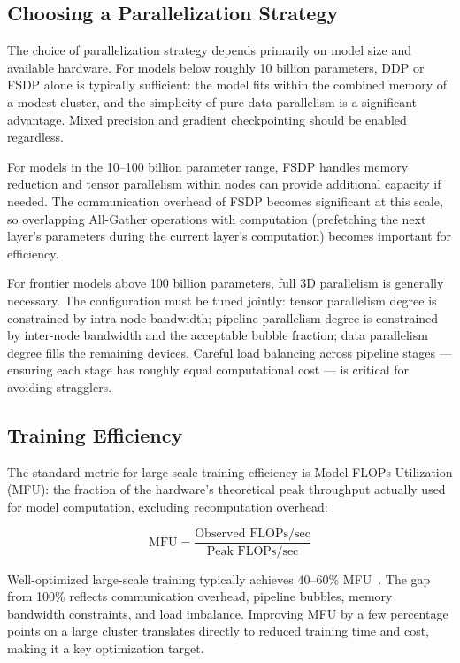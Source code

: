 \documentclass{book}
\begin{document}
\subsection{Choosing a Parallelization Strategy}
\label{sec:choosing_parallelism}

The choice of parallelization strategy depends primarily on model size and
available hardware. For models below roughly 10 billion parameters, DDP or
FSDP alone is typically sufficient: the model fits within the combined memory
of a modest cluster, and the simplicity of pure data parallelism is a
significant advantage. Mixed precision and gradient checkpointing should be
enabled regardless.

For models in the 10--100 billion parameter range, FSDP handles memory
reduction and tensor parallelism within nodes can provide additional capacity
if needed. The communication overhead of FSDP becomes significant at this
scale, so overlapping All-Gather operations with computation (prefetching
the next layer's parameters during the current layer's computation) becomes
important for efficiency.

For frontier models above 100 billion parameters, full 3D parallelism is
generally necessary. The configuration must be tuned jointly: tensor
parallelism degree is constrained by intra-node bandwidth; pipeline parallelism
degree is constrained by inter-node bandwidth and the acceptable bubble
fraction; data parallelism degree fills the remaining devices. Careful
load balancing across pipeline stages --- ensuring each stage has roughly
equal computational cost --- is critical for avoiding stragglers.

\subsection{Training Efficiency}
\label{sec:mfu}

The standard metric for large-scale training efficiency is Model FLOPs
Utilization (MFU): the fraction of the hardware's theoretical peak
throughput actually used for model computation, excluding recomputation
overhead:

\begin{equation}
\label{eq:mfu}
\text{MFU} = \frac{\text{Observed FLOPs/sec}}{\text{Peak FLOPs/sec}}
\end{equation}

Well-optimized large-scale training typically achieves 40--60\%
MFU~\cite{chowdhery2023palm}. The gap from 100\% reflects communication
overhead, pipeline bubbles, memory bandwidth constraints, and load imbalance.
Improving MFU by a few percentage points on a large cluster translates
directly to reduced training time and cost, making it a key optimization
target.
\end{document}
